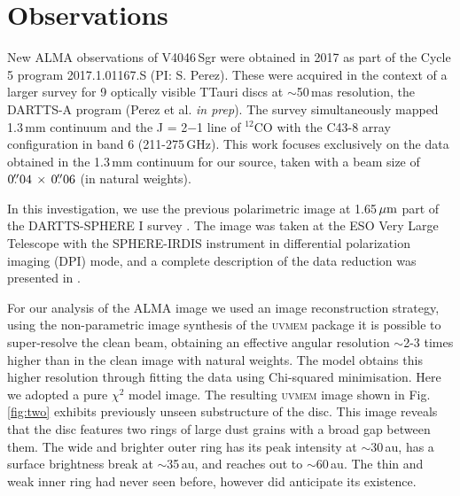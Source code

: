\documentclass[letters,usenatbib,times]{mnras}
\begin{document}
\section{Observations} \label{sec:Observations}


New ALMA observations of V4046\,Sgr were obtained in 2017 as part of the Cycle 5 program 2017.1.01167.S (PI: S. Perez). These were acquired in the context of a larger survey for 9 optically visible TTauri discs at $\sim$50\,mas resolution, the DARTTS-A program (Perez et al. {\em in prep}). The survey simultaneously mapped 1.3\,mm continuum and the J = 2$-$1 line of $^{12}$CO with the C43-8 array configuration in band 6 (211-275\,GHz). This work focuses exclusively on the data obtained in the 1.3\,mm continuum for our source, taken with a beam size of $0\hbox{$.\!\!^{\prime\prime}$}04 \,\times \, 0\hbox{$.\!\!^{\prime\prime}$}06$ (in natural weights).

In this investigation, we use the previous polarimetric image at 1.65\,$\hbox{$\mu$m}$ part of the DARTTS-SPHERE I survey \citep{Avenhaus_2018}. The image was taken at the ESO Very Large Telescope with the SPHERE-IRDIS instrument in differential polarization imaging (DPI) mode, and a complete description of the data reduction was presented in \citet{Avenhaus_2018}. 

For our analysis of the ALMA image we used an image reconstruction strategy, using the non-parametric image synthesis of the \textsc{uvmem} package \citep{2006ApJ...639..951C, 2018A&C....22...16C} it is possible to super-resolve the clean beam, obtaining an effective angular resolution $\sim$2-3 times higher than in the clean image with natural weights. The model obtains this higher resolution through fitting the data using Chi-squared minimisation. Here we adopted a pure $\chi^2$ model image. The resulting \textsc{uvmem} image shown in Fig. \ref{fig:two} exhibits previously unseen substructure of the disc. This image reveals that the disc features two rings of large dust grains with a broad gap between them. The wide and brighter outer ring has its peak intensity at $\sim$30\,au, has a surface brightness break at $\sim$35\,au, and reaches out to $\sim$60\,au. The thin and weak inner ring had never seen before, however \citet{Ru_z_Rodr_guez_2019} did anticipate its existence.
\end{document}
